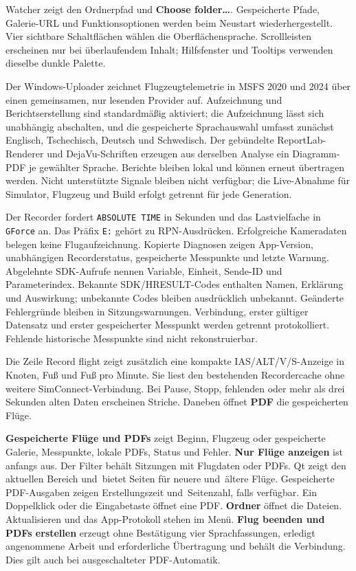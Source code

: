 \documentclass[11pt,a4paper]{article}
\newcommand{\ui}[1]{\textbf{#1}}
\begin{document}
Watcher zeigt den Ordnerpfad und \ui{Choose folder…}.
Gespeicherte Pfade, Galerie-URL und Funktionsoptionen werden beim Neustart
wiederhergestellt. Vier sichtbare Schaltflächen wählen die Oberflächensprache.
Scrollleisten erscheinen nur bei überlaufendem Inhalt; Hilfsfenster und
Tooltips verwenden dieselbe dunkle Palette.

Der Windows-Uploader zeichnet Flugzeugtelemetrie in MSFS 2020 und 2024 über
einen gemeinsamen, nur lesenden Provider auf. Aufzeichnung und
Berichtserstellung
sind standardmäßig aktiviert; die Aufzeichnung lässt sich unabhängig abschalten,
und die gespeicherte Sprachauswahl umfasst zunächst Englisch, Tschechisch,
Deutsch und Schwedisch. Der gebündelte ReportLab-Renderer und DejaVu-Schriften
erzeugen aus derselben Analyse ein Diagramm-PDF je gewählter Sprache. Berichte
bleiben lokal und können erneut übertragen werden. Nicht unterstützte Signale
bleiben nicht verfügbar; die Live-Abnahme für Simulator, Flugzeug und Build
erfolgt getrennt für jede Generation.

Der Recorder fordert \texttt{ABSOLUTE TIME} in Sekunden und das Lastvielfache
in \texttt{GForce} an. Das Präfix \texttt{E:} gehört zu RPN-Ausdrücken.
Erfolgreiche Kameradaten belegen keine Flugaufzeichnung. Kopierte Diagnosen
zeigen App-Version, unabhängigen Recorderstatus, gespeicherte Messpunkte und
letzte Warnung. Abgelehnte SDK-Aufrufe nennen Variable, Einheit, Sende-ID und
Parameterindex. Bekannte SDK/HRESULT-Codes enthalten Namen, Erklärung und
Auswirkung; unbekannte Codes bleiben ausdrücklich unbekannt. Geänderte
Fehlergründe bleiben in Sitzungswarnungen. Verbindung, erster gültiger Datensatz
und erster gespeicherter Messpunkt werden getrennt protokolliert.
Fehlende historische Messpunkte sind nicht rekonstruierbar.

Die Zeile Record flight zeigt zusätzlich eine kompakte IAS/ALT/V/S-Anzeige
in Knoten, Fuß und Fuß pro Minute. Sie liest den bestehenden Recordercache
ohne weitere SimConnect-Verbindung. Bei Pause, Stopp, fehlenden oder mehr als
drei Sekunden alten Daten erscheinen Striche. Daneben öffnet \ui{PDF}
die gespeicherten Flüge.

\ui{Gespeicherte Flüge und PDFs} zeigt Beginn, Flugzeug oder gespeicherte
Galerie, Messpunkte, lokale PDFs, Status und Fehler. \ui{Nur Flüge anzeigen}
ist anfangs aus. Der Filter behält Sitzungen mit Flugdaten oder PDFs.
Qt zeigt den aktuellen Bereich und~bietet Seiten für neuere und~ältere Flüge.
Gespeicherte PDF-Ausgaben zeigen Erstellungszeit und~Seitenzahl, falls verfügbar.
Ein Doppelklick oder die Eingabetaste öffnet eine PDF. \ui{Ordner} öffnet
die Dateien. Aktualisieren und das App-Protokoll stehen im Menü.
\ui{Flug beenden und PDFs erstellen} erzeugt ohne Bestätigung vier
Sprachfassungen,
erledigt angenommene Arbeit und erforderliche Übertragung und behält die
Verbindung. Dies gilt auch bei ausgeschalteter PDF-Automatik.
\end{document}
